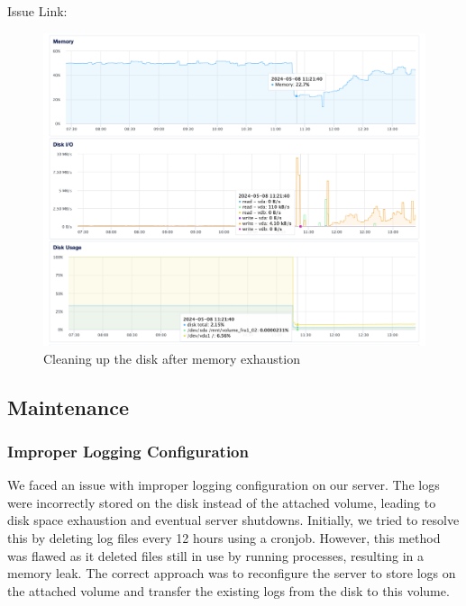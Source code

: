 Issue Link:

\begin{figure}[H]
\centering
\includegraphics[height=0.9\textwidth]{images/CleanUpMemoryLeakGrafanaServer.png}
\caption{Cleaning up the disk after memory exhaustion}
\label{fig:grafana-memoryleak}
\end{figure}


\subsection{Maintenance}
\subsubsection{Improper Logging Configuration}
We faced an issue with improper logging configuration on our server. The logs were incorrectly stored on the disk instead of the attached volume, leading to disk space exhaustion and eventual server shutdowns. Initially, we tried to resolve this by deleting log files every 12 hours using a cronjob. However, this method was flawed as it deleted files still in use by running processes, resulting in a memory leak. The correct approach was to reconfigure the server to store logs on the attached volume and transfer the existing logs from the disk to this volume.

